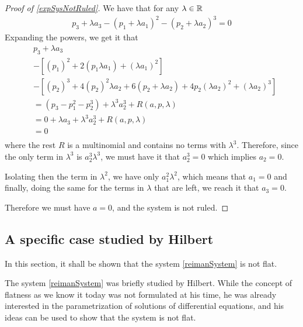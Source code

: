 \documentclass[12pt]{article}
\begin{document}
\begin{proof}[ Proof of \ref{expSysNotRuled}]
  We have that for any $\lambda \in \mathbb{R}$
  \begin{equation}\begin{aligned}
    p_3 + \lambda a_3 - (p_1 + \lambda a_1)^2 - (p_2 + \lambda a_2)^3 = 0
  \end{aligned}\end{equation}
  Expanding the powers, we get it that
  \begin{equation}\begin{aligned}
    &p_3 + \lambda a_3 \\
    &- [(p_1)^2 + 2(p_1 \lambda a_1) + (\lambda a_1)^2] \\
    &- [(p_2)^3 + 4(p_2)^2 \lambda a_2 + 6(p_2 + \lambda a_2) + 4 p_2(\lambda a_2)^2 + (\lambda a_2)^3 ] \\
    &= ( p_3 - p_1^2 - p_2^3 ) + \lambda^3 a_2^3 + R(a,p,\lambda) \\
    &= 0 + \lambda a_3 + \lambda^3 a_2^3 + R(a,p,\lambda) \\
    &= 0 \\
  \end{aligned}\end{equation}
  where the rest $R$ is a multinomial and contains no terms with $\lambda^3$. Therefore, since the only term in
  $\lambda^3$ is $a_2^3 \lambda ^3$, we must have it that $a_2^3 = 0 $ which implies $a_2 = 0 $.
  
  Isolating then the term in $\lambda^2$, we have only $a_1^2 \lambda^2$, which means that $a_1 = 0$ and finally,
  doing the same for the terms in $\lambda$ that are left, we reach it that $a_3 = 0$.
  
  Therefore we must have $a=0$, and the system is not ruled.
  
\end{proof}

\subsection{A specific case studied by Hilbert} \label{secHilbertCase}

In this section, it shall be shown that the system \eqref{reimanSystem} is not flat.

\begin{historicalRemark} The system \eqref{reimanSystem} was briefly studied by Hilbert.
While the concept of flatness as we know it today was not formulated at his time,
he was already interested in the parametrization of solutions of differential
equations, and his ideas can be used to show that the system is not flat.
\end{historicalRemark}
\end{document}
